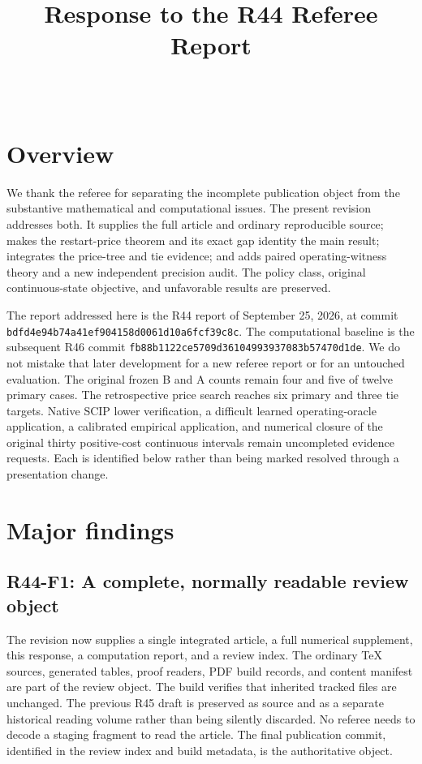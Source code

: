
\begin{frontmatter}\title{Response to the R44 Referee Report}\begin{aug}\author[id=au1,addressref={add1}]{~}\address[id=add1]{}\end{aug}\end{frontmatter}
\section{Overview}
We thank the referee for separating the incomplete publication object from the substantive mathematical and computational issues. The present revision addresses both. It supplies the full article and ordinary reproducible source; makes the restart-price theorem and its exact gap identity the main result; integrates the price-tree and tie evidence; and adds paired operating-witness theory and a new independent precision audit. The policy class, original continuous-state objective, and unfavorable results are preserved.

The report addressed here is the R44 report of September 25, 2026, at commit \texttt{bdfd4e94b74a41ef904158d0061d10a6fcf39c8c}. The computational baseline is the subsequent R46 commit \texttt{fb88b1122ce5709d36104993937083b57470d1de}. We do not mistake that later development for a new referee report or for an untouched evaluation. The original frozen B and A counts remain four and five of twelve primary cases. The retrospective price search reaches six primary and three tie targets. Native SCIP lower verification, a difficult learned operating-oracle application, a calibrated empirical application, and numerical closure of the original thirty positive-cost continuous intervals remain uncompleted evidence requests. Each is identified below rather than being marked resolved through a presentation change.
\section{Major findings}
\subsection{R44-F1: A complete, normally readable review object}
The revision now supplies a single integrated article, a full numerical supplement, this response, a computation report, and a review index. The ordinary TeX sources, generated tables, proof readers, PDF build records, and content manifest are part of the review object. The build verifies that inherited tracked files are unchanged. The previous R45 draft is preserved as source and as a separate historical reading volume rather than being silently discarded. No referee needs to decode a staging fragment to read the article. The final publication commit, identified in the review index and build metadata, is the authoritative object.

